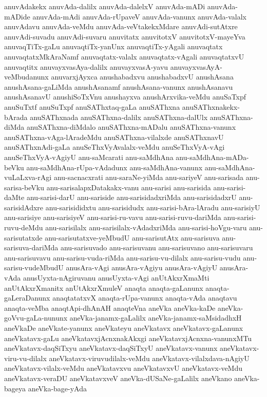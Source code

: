 {anuvAdakekx
anuvAda-dalilx
anuvAda-dalelxV
anuvAda-mADi
anuvAda-mADide
anuvAda-mAdi
anuvAda-rUpaveV
anuvAda-vanunx
anuvAda-valalx
anuvAdavu
anuvAda-veMdu
anuvAda-veVtakekxMdare
anuvAdi-sutAtxre
anuvAdi-suvadu
anuvAdi-suvaru
anuvitatx
anuvitotxV
anuvitotxV-mayeYva
anuvaqTiTx-gaLu
anuvaqtiTx-yanUnx
anuvaqtiTx-yAgali
anuvaqtatx
anuvaqtatxMkAraNamf
anuvaqtatx-valalx
anuvaqtatx-vAgali
anuvaqtatxvU
anuvaqtitx
anuvayxvasAya-dalilx
anuvayxvasA-yavu
anuvayxvasAyA-veMbudanunx
anuvarxjAyxca
anushabadxvu
anushabadxvU
anushAsana
anushAsana-gaLiMda
anushAsanamf
anushAsana-vanunx
anushAsanavu
anushAsanavU
anushiSoTxVnu
anushayxva
anushArxvika-veMdu
anuSaTxpf
anuSuTxtf
anuSuTxpf
anuSAThxtaq-gaLa
anuSAThxna
anuSAThxnakekx-bArada
anuSAThxnada
anuSAThxna-dalilx
anuSAThxna-dalUlx
anuSAThxna-diMda
anuSAThxna-diMdalo
anuSAThxna-mADalu
anuSAThxna-vanunx
anuSAThxna-vAga-lAradeMdu
anuSAThxna-vilalxde
anuSAThxnavU
anuSAThxnAdi-gaLa
anuSeThxVyAvalalx-veMdu
anuSeThxVyA-vAgi
anuSeThxVyA-vAgiyU
anu-saMcarati
anu-saMdhAna
anu-saMdhAna-mADa-beVku
anu-saMdhAna-rUpa-vAdadunx
anu-saMdhAna-vanunx
anu-saMdhAna-vuLaLxva-rAgi
anu-sacnacxrati
anu-saraNe-yiMda
anu-sariyeV
anu-sarisada
anu-sarisa-beVku
anu-sarisalapxDatakakx-vanu
anu-sarisi
anu-sarisida
anu-sarisi-daMte
anu-sarisi-darU
anu-sariside
anu-sarisidadxriMda
anu-sarisidadxrU
anu-sarisidAdxre
anu-sarisididxtu
anu-sarisidudx
anu-sarisi-bAra-lAradu
anu-sarisiyU
anu-sarisiye
anu-sarisiyeV
anu-sarisi-ru-vavu
anu-sarisi-ruvu-dariMda
anu-sarisi-ruvu-deMdu
anu-sarisilalx
anu-sarisilalx-vAdadxriMda
anu-sarisi-hoVgu-varu
anu-sarisutatxde
anu-sarisutatxve-yeMbudU
anu-sarisutAtx
anu-sarisuva
anu-sarisuva-dariMda
anu-sarisuvado
anu-sarisuvanu
anu-sarisuvano
anu-sarisuvaru
anu-sarisuvavu
anu-sarisu-vuda-riMda
anu-sarisu-vu-dilalx
anu-sarisu-vudu
anu-sarisu-vudeMbudU
anusAra-vAgi
anusAra-vAgiyu
anusAra-vAgiyU
anusAra-vAda
anusUyxta-nAgiruvanu
anusUyxta-vAgi
anUtAkxrXmaMti
anUtAkxrXmanitx
anUtAkxrXmuleV
anaqta
anaqta-gaLanunx
anaqta-gaLeraDanunx
anaqtatatxvX
anaqta-rUpa-vanunx
anaqta-vAda
anaqtavu
anaqta-veMba
anaqtApi-dhAnAH
anaqteVna
aneVka
aneVka-kaDe
aneVka-goVvu-gaLa-nununx
aneVka-janamx-gaLalilx
aneVka-janamx-saMsidadhxH
aneVkaDe
aneVkate-yanunx
aneVkateyu
aneVkatavx
aneVkatavx-gaLanunx
aneVkatavx-gaLu
aneVkatavxjAcnxnakAkxgi
aneVkatavxjAcnxna-vanunxMTu
aneVkatavx-daqSiTxyu
aneVkatavx-daqSiTxyU
aneVkatavx-vanunx
aneVkatavx-viru-vu-dilalx
aneVkatavx-viruvudilalx-veMdu
aneVkatavx-vilalxdava-nAgiyU
aneVkatavx-vilalx-veMdu
aneVkatavxvu
aneVkatavxvU
aneVkatavx-veMdu
aneVkatavx-veraDU
aneVkatavxveV
aneVka-dUSaNe-gaLalilx
aneVkano
aneVka-bageya
aneVka-bage-yAda
}
